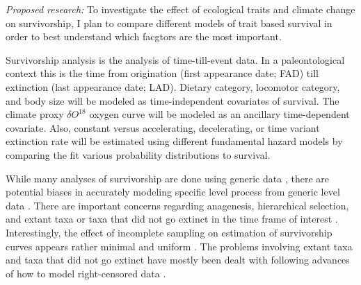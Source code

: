 \documentclass[12pt,letterpaper]{article}
\begin{document}
\textit{Proposed research:}
To investigate the effect of ecological traits and climate change on survivorship, I plan to compare different models of trait based survival in order to best understand which facgtors are the most important.

Survivorship analysis is the analysis of time-till-event data. In a paleontological context this is the time from origination (first appearance date; FAD) till extinction (last appearance date; LAD). Dietary category, locomotor category, and body size will be modeled as time-independent covariates of survival. The climate proxy \(\delta O^{18}\) oxygen curve \citep{Zachos2008} will be modeled as an ancillary time-dependent covariate. Also, constant versus accelerating, decelerating, or time variant extinction rate will be estimated using different fundamental hazard models by comparing the fit various probability distributions to survival.



While many analyses of survivorship are done using generic data \citep{Tomiya2013,Liow2008,Harnik2013}, there are potential biases in accurately modeling specific level process from generic level data \citep{Raup1975,Sepkoski1975,Simpson2006,Raup1991a,VanValen1979}. There are important concerns regarding anagenesis, hierarchical selection, and extant taxa or taxa that did not go extinct in the time frame of interest \citep{Raup1975,VanValen1979,Simpson2006,Raup1991a}. Interestingly, the effect of incomplete sampling on estimation of survivorship curves appears rather minimal and uniform \citep{Sepkoski1975}. The problems involving extant taxa and taxa that did not go extinct have mostly been dealt with following advances of how to model right-censored data \citep{Kleinbaum2005}.
\end{document}
